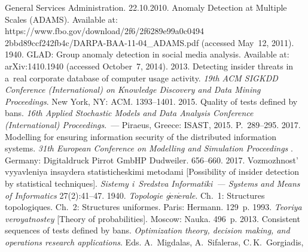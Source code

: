   \begin{multicols}{2}

\renewcommand{\bibname}{\protect\rmfamily References}

{\small\frenchspacing
 {%
 \begin{thebibliography}{99}
     General Services Administration.  
22.10.2010. 
     Anomaly Detection at Multiple Scales (ADAMS).  Available at: 
{\sf   
https://www.fbo.gov/download/2f6/2f6289e99a0c0494 2bbd89ccf242fb4c/DARPA-BAA-11-04\_ADAMS.pdf}
(accessed May~12, 2011).
      1940. GLAD: Group anomaly detection in social media 
analysis. Available at: {\sf \mbox{arXiv}:1410.1940} (accessed October~7, 2014).
      2013. Detecting insider threats in a~real corporate 
database of computer usage activity. \textit{19th ACM SIGKDD Conference (International) on 
Knowledge Discovery and Data Mining Proceedings}. New York, NY: ACM. 1393--1401.
 2015.
Quality of tests defined by bans. \textit{16th Applied Stochastic Models and Data Analysis 
Conference (International) Proceedings}.~--- Piraeus, Greece: ISAST, 2015. P.~289--295. 
      2017. Modelling for ensuring information 
security of the distributed information systems. \textit{31th European Conference on Modelling and 
Simulation Proceedings }.  Germany: Digitaldruck Pirrot GmbHP Dudweiler. 656--660.
      2017. Vozmozhnost' vyyavleniya insaydera statisticheskimi 
metodami [Possibility of insider detection by statistical techniques]. \textit{Sistemy i~Sredstva 
Informatiki~--- Systems and Means of Informatics} 27(2):41--47.
      1940. \textit{Topologie g$\acute{\mbox{e}}$n$\acute{\mbox{e}}$rale}. 
Ch.~1: Structures topologiques. Ch.~2: Structures uniformes. Paris: Hermann. 129~p.
      1993. \textit{Teoriya veroyatnostey} [Theory 
of probabilities]. Moscow: Nauka. 496~p. 
      2013. Consistent sequences of tests defined by 
     bans.  \textit{Optimization theory, decision  making, and operations research applications}.  
     Eds. A.~Migdalas, A.~Sifaleras, C.\,K.~Gorgiadis,

\end{thebibliography}}}
\end{multicols}
